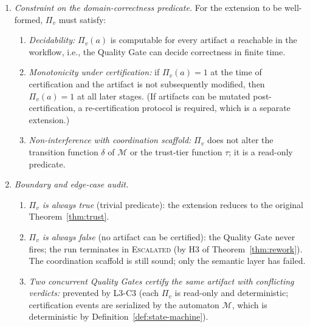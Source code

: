 \documentclass[12pt]{article}
\theoremstyle{definition}
\begin{document}
\begin{enumerate}
    \item \emph{Constraint on the domain-correctness predicate.}
          For the extension to be well-formed, $\Pi_v$ must satisfy:
          \begin{enumerate}
              \item[L3-C1] \emph{Decidability:} $\Pi_v(a)$ is
                           computable for every artifact $a$ reachable
                           in the workflow, i.e., the Quality Gate
                           can decide correctness in finite time.
              \item[L3-C2] \emph{Monotonicity under certification:}
                           if $\Pi_v(a) = 1$ at the time of
                           certification and the artifact is not
                           subsequently modified, then $\Pi_v(a) = 1$
                           at all later stages.  (If artifacts can be
                           mutated post-certification, a re-certification
                           protocol is required, which is a separate
                           extension.)
              \item[L3-C3] \emph{Non-interference with coordination
                           scaffold:} $\Pi_v$ does not alter the
                           transition function $\delta$ of
                           $\mathcal{M}$ or the trust-tier function
                           $\tau$; it is a read-only predicate.
          \end{enumerate}

    \item \emph{Boundary and edge-case audit.}
          \begin{enumerate}
              \item[L3-E1] \emph{$\Pi_v$ is always true} (trivial
                           predicate): the extension reduces to the
                           original Theorem~\ref{thm:trust}.
              \item[L3-E2] \emph{$\Pi_v$ is always false} (no artifact
                           can be certified): the Quality Gate never
                           fires; the run terminates in
                           \textsc{Escalated} (by H3 of
                           Theorem~\ref{thm:rework}).  The coordination
                           scaffold is still sound; only the semantic
                           layer has failed.
              \item[L3-E3] \emph{Two concurrent Quality Gates certify
                           the same artifact with conflicting verdicts:}
                           prevented by L3-C3 (each $\Pi_v$ is
                           read-only and deterministic; certification
                           events are serialized by the automaton
                           $\mathcal{M}$, which is deterministic by
                           Definition~\ref{def:state-machine}).
          \end{enumerate}


\end{enumerate}
\end{document}
